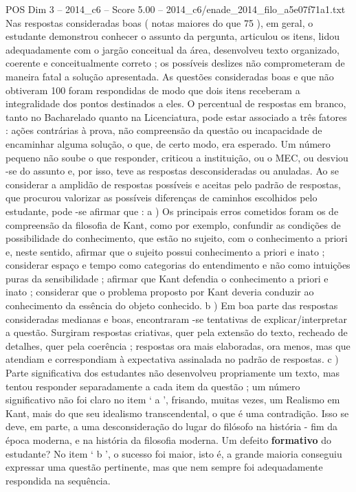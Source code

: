 \begin{textsample}{POS Dim 3 – 2014\_c6 – Score 5.00 – 2014\_c6/enade\_2014\_filo\_a5e07f71a1.txt}
Nas respostas consideradas boas ( notas maiores do que 75 ), em geral, o estudante demonstrou conhecer o assunto da pergunta, articulou os itens, lidou adequadamente com o jargão conceitual da área, desenvolveu texto organizado, coerente e conceitualmente correto ; os possíveis deslizes não comprometeram de maneira fatal a solução apresentada.
As questões consideradas boas e que não obtiveram 100 foram respondidas de modo que dois itens receberam a integralidade dos pontos destinados a eles.
O percentual de respostas em branco, tanto no Bacharelado quanto na Licenciatura, pode estar associado a três fatores : ações contrárias à prova, não compreensão da questão ou incapacidade de encaminhar alguma solução, o que, de certo modo, era esperado.
Um número pequeno não soube o que responder, criticou a instituição, ou o MEC, ou desviou -se do assunto e, por isso, teve as respostas desconsideradas ou anuladas.
Ao se considerar a amplidão de respostas possíveis e aceitas pelo padrão de respostas, que procurou valorizar as possíveis diferenças de caminhos escolhidos pelo estudante, pode -se afirmar que : a ) Os principais erros cometidos foram os de compreensão da filosofia de Kant, como por exemplo, confundir as condições de possibilidade do conhecimento, que estão no sujeito, com o conhecimento a priori e, neste sentido, afirmar que o sujeito possui conhecimento a priori e inato ; considerar espaço e tempo como categorias do entendimento e não como intuições puras da sensibilidade ; afirmar que Kant defendia o conhecimento a priori e inato ; considerar que o problema proposto por Kant deveria conduzir ao conhecimento da essência do objeto conhecido. b ) Em boa parte das respostas consideradas medianas e boas, encontraram -se tentativas de explicar/interpretar a questão.
Surgiram respostas criativas, quer pela extensão do texto, recheado de detalhes, quer pela coerência ; respostas ora mais elaboradas, ora menos, mas que atendiam e correspondiam à expectativa assinalada no padrão de respostas. c ) Parte significativa dos estudantes não desenvolveu propriamente um texto, mas tentou responder separadamente a cada item da questão ; um número significativo não foi claro no item ‘ a ’, frisando, muitas vezes, um Realismo em Kant, mais do que seu idealismo transcendental, o que é uma contradição.
Isso se deve, em parte, a uma desconsideração do lugar do filósofo na história - fim da época moderna, e na história da filosofia moderna.
Um defeito \textbf{formativo} do estudante?
No item ‘ b ’, o sucesso foi maior, isto é, a grande maioria conseguiu expressar uma questão pertinente, mas que nem sempre foi adequadamente respondida na sequência.

\end{textsample}
